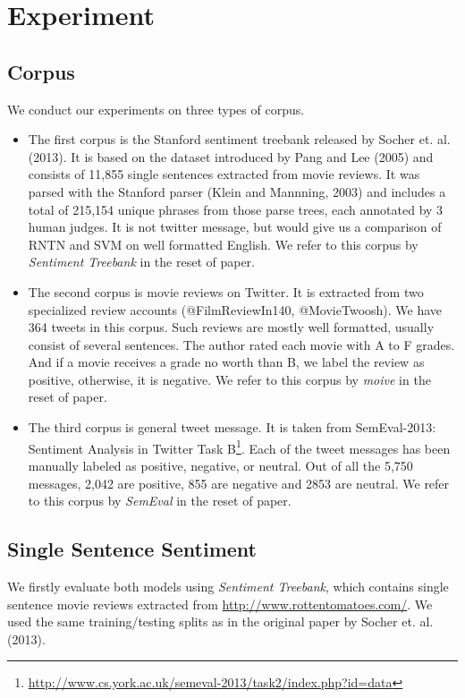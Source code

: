 \newpage
\section{Experiment}
\subsection{Corpus}
We conduct our experiments on three types of corpus.
\begin{itemize}
\item  The first corpus is the Stanford sentiment treebank released by Socher et. al. (2013). It is based on the dataset introduced by Pang and Lee (2005) and consists of 11,855 single sentences extracted from movie reviews. It was parsed with the Stanford parser (Klein and Mannning, 2003) and includes a total of 215,154 unique phrases from those parse trees, each annotated by 3 human judges. It is not twitter message, but would give us a comparison of RNTN and SVM on well formatted English. We refer to this corpus by \textit{Sentiment Treebank} in the reset of paper. 

\item  The second corpus is movie reviews on Twitter. It is extracted from two specialized review accounts (@FilmReviewIn140, @MovieTwoosh). We have 364 tweets in this corpus. Such reviews are mostly well formatted, usually consist of several sentences. The author rated each movie with A to F grades. And if a movie receives a grade no worth than B, we label the review as positive, otherwise, it is negative. We refer to this corpus by \textit{moive} in the reset of paper. 

\item The third corpus is general tweet message. It is taken from SemEval-2013: Sentiment Analysis in Twitter Task B\footnote{\url{http://www.cs.york.ac.uk/semeval-2013/task2/index.php?id=data}}. Each of the tweet messages has been manually labeled as positive, negative, or neutral. Out of all the 5,750 messages, 2,042 are positive, 855 are negative and 2853 are neutral.  We refer to this corpus by \textit{SemEval} in the reset of paper. 
\end{itemize}

\subsection{Single Sentence Sentiment}
We firstly evaluate both models using \textit{Sentiment Treebank}, which contains single sentence movie reviews extracted from \url{http://www.rottentomatoes.com/}. We used the same training/testing splits as in the original paper by Socher et. al. (2013). 

